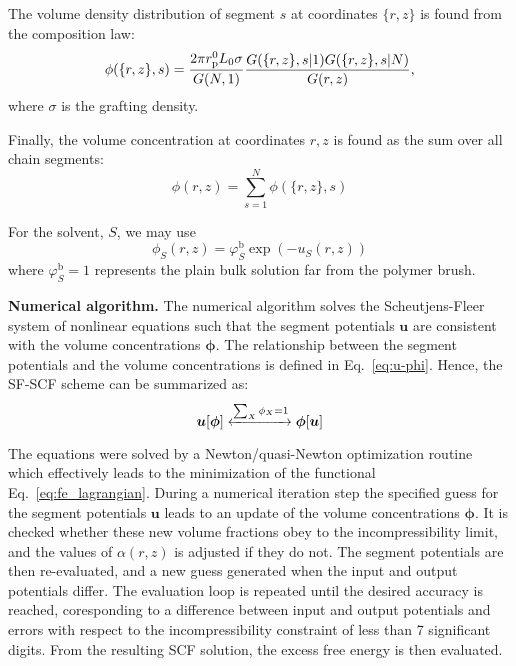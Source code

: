 \documentclass[10pt, a4paper, twocolumn]{article}
\begin{document}
The volume density distribution of segment $s$ at coordinates $\{r, z\}$ is found from the composition law:
\begin{equation}
    \label{eq:propagation}
    \phi(\{r, z\}, s) = \\
    \frac{2 \pi r_\text{p}^0 L_0 \sigma}{G(N,1)} \frac{G(\{r, z\}, s | 1) G(\{r, z\}, s | N)}{G(r, z)},
\end{equation}
where $\sigma$ is the grafting density.

Finally, the volume concentration at coordinates $r, z$ is found as the sum over all chain segments:
\begin{equation}
    \phi(r, z) = \sum_{s=1}^{N} \phi(\{r, z\}, s)
\end{equation}

For the solvent, $S$, we may use
\begin{equation}
    \phi_S(r,z) =\varphi_S^\text{b} \exp (-u_S(r,z))
\end{equation}
where $\varphi_S^\text{b} = 1$ represents the plain bulk solution far from the polymer brush. 

\bigskip\noindent
\textbf{Numerical algorithm.}
The numerical algorithm solves the Scheutjens-Fleer system of nonlinear equations such that the segment potentials $\bm{u}$ are consistent with the volume concentrations $\boldsymbol{\phi}$.
The relationship between the segment potentials and the volume concentrations is defined in Eq.~\eqref{eq:u-phi}.
Hence, the SF-SCF scheme can be summarized as:
\begin{equation}
    \boldsymbol{u}[\boldsymbol{\phi}] \xleftrightarrow[]{\sum_{X} \phi_X = 1} \boldsymbol{\phi}[\boldsymbol{u}]
\end{equation}

The equations were solved by a Newton/quasi-Newton optimization routine which effectively leads to the minimization of the functional Eq.~\eqref{eq:fe_lagrangian}.
During a numerical iteration step the specified guess for the segment potentials $\bm{u}$ leads to an update of the volume concentrations $\bm{\phi}$.
It is checked whether these new volume fractions obey to the incompressibility limit, and the values of $\alpha(r, z)$ is adjusted if they do not.
The segment potentials are then re-evaluated, and a new guess generated when the input and output potentials differ.
The evaluation loop is repeated until the desired accuracy is reached, coresponding to a difference between input and output potentials and errors with respect to the incompressibility constraint of less than 7 significant digits.
From the resulting SCF solution, the excess free energy is then evaluated.
\end{document}
